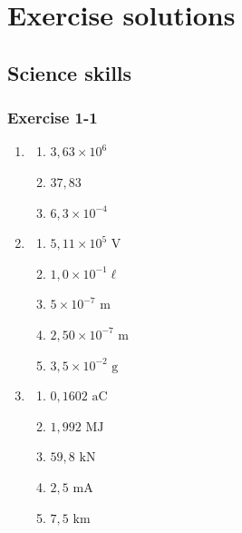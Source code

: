 \chapter{Exercise solutions}
\section{Science skills}

\subsection{Exercise 1-1} 
\begin{multicols}{3}
\begin{enumerate}[noitemsep, label=\textbf{\arabic*}. ] 
\item %
  \begin{enumerate}[itemsep=5pt, label=\textbf{(\alph*)} ] 
    \item $3,63 \times 10^6$
    \item $37,83$
    \item $6,3 \times 10^{−4}$
    \end{enumerate}
\item %
    \begin{enumerate}[itemsep=5pt, label=\textbf{(\alph*)} ] 
    \item $5,11 \times 10^{5} \text{ V}$
    \item $1,0 \times 10^{-1} \ell$
    \item $5 \times 10^{-7} \text{ m}$
    \item $2,50 \times 10^{-7} \text{ m}$
    \item $3,5 \times 10^{-2} \text{ g}$
    \end{enumerate}
 \item %
    \begin{enumerate}[itemsep=5pt, label=\textbf{(\alph*)} ] 
    \item $0,1602 \text{ aC}$
    \item $1,992 \text{ MJ}$
    \item $59,8 \text{ kN}$
    \item $2,5 \text{ mA}$
    \item $7,5 \text{ km}$
    \end{enumerate}
\end{enumerate}
\end{multicols}
